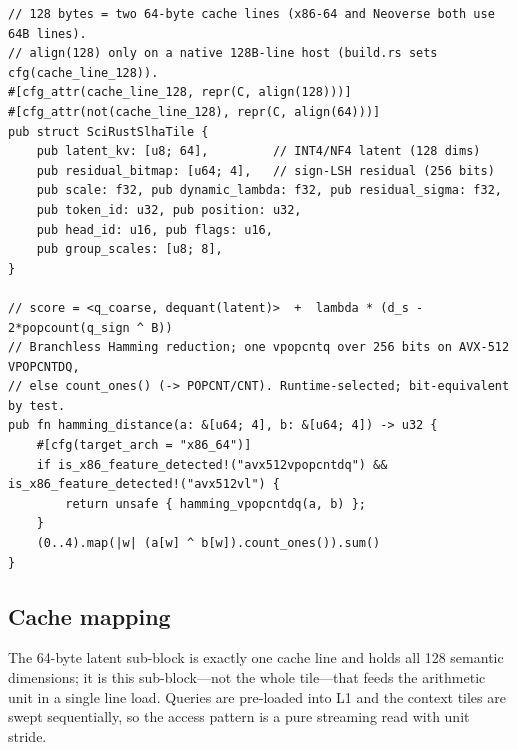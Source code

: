 \documentclass[11pt]{article}
\theoremstyle{plain}
\theoremstyle{definition}
\begin{document}
\begin{lstlisting}[caption={Core tile and fused score (abridged from
\texttt{scirust/src/attention/slha\_v2.rs}).},captionpos=b]
// 128 bytes = two 64-byte cache lines (x86-64 and Neoverse both use 64B lines).
// align(128) only on a native 128B-line host (build.rs sets cfg(cache_line_128)).
#[cfg_attr(cache_line_128, repr(C, align(128)))]
#[cfg_attr(not(cache_line_128), repr(C, align(64)))]
pub struct SciRustSlhaTile {
    pub latent_kv: [u8; 64],         // INT4/NF4 latent (128 dims)
    pub residual_bitmap: [u64; 4],   // sign-LSH residual (256 bits)
    pub scale: f32, pub dynamic_lambda: f32, pub residual_sigma: f32,
    pub token_id: u32, pub position: u32,
    pub head_id: u16, pub flags: u16,
    pub group_scales: [u8; 8],
}

// score = <q_coarse, dequant(latent)>  +  lambda * (d_s - 2*popcount(q_sign ^ B))
// Branchless Hamming reduction; one vpopcntq over 256 bits on AVX-512 VPOPCNTDQ,
// else count_ones() (-> POPCNT/CNT). Runtime-selected; bit-equivalent by test.
pub fn hamming_distance(a: &[u64; 4], b: &[u64; 4]) -> u32 {
    #[cfg(target_arch = "x86_64")]
    if is_x86_feature_detected!("avx512vpopcntdq") && is_x86_feature_detected!("avx512vl") {
        return unsafe { hamming_vpopcntdq(a, b) };
    }
    (0..4).map(|w| (a[w] ^ b[w]).count_ones()).sum()
}
\end{lstlisting}

\subsection{Cache mapping}
\label{sec:cachemap}
The 64-byte latent sub-block is exactly one cache line and holds all 128
semantic dimensions; it is this sub-block---not the whole tile---that
feeds the arithmetic unit in a single line load. Queries are pre-loaded
into L1 and the context tiles are swept sequentially, so the access
pattern is a pure streaming read with unit stride.
\end{document}
